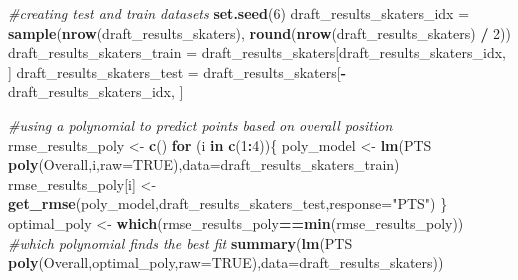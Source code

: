 \documentclass[]{article}
\newenvironment{Shaded}{\begin{snugshade}}{\end{snugshade}}
\newcommand{\CommentTok}[1]{\textcolor[rgb]{0.56,0.35,0.01}{\textit{#1}}}
\newcommand{\ControlFlowTok}[1]{\textcolor[rgb]{0.13,0.29,0.53}{\textbf{#1}}}
\newcommand{\DataTypeTok}[1]{\textcolor[rgb]{0.13,0.29,0.53}{#1}}
\newcommand{\DecValTok}[1]{\textcolor[rgb]{0.00,0.00,0.81}{#1}}
\newcommand{\KeywordTok}[1]{\textcolor[rgb]{0.13,0.29,0.53}{\textbf{#1}}}
\newcommand{\NormalTok}[1]{#1}
\newcommand{\OperatorTok}[1]{\textcolor[rgb]{0.81,0.36,0.00}{\textbf{#1}}}
\newcommand{\OtherTok}[1]{\textcolor[rgb]{0.56,0.35,0.01}{#1}}
\newcommand{\StringTok}[1]{\textcolor[rgb]{0.31,0.60,0.02}{#1}}
\begin{document}
\begin{Shaded}
\begin{Highlighting}[]
\CommentTok{#creating test and train datasets}
\KeywordTok{set.seed}\NormalTok{(}\DecValTok{6}\NormalTok{)}
\NormalTok{draft_results_skaters_idx =}\StringTok{ }\KeywordTok{sample}\NormalTok{(}\KeywordTok{nrow}\NormalTok{(draft_results_skaters), }\KeywordTok{round}\NormalTok{(}\KeywordTok{nrow}\NormalTok{(draft_results_skaters) }\OperatorTok{/}\StringTok{ }\DecValTok{2}\NormalTok{))}
\NormalTok{draft_results_skaters_train =}\StringTok{ }\NormalTok{draft_results_skaters[draft_results_skaters_idx, ]}
\NormalTok{draft_results_skaters_test =}\StringTok{ }\NormalTok{draft_results_skaters[}\OperatorTok{-}\NormalTok{draft_results_skaters_idx, ]}

\CommentTok{#using a polynomial to predict points based on overall position}
\NormalTok{rmse_results_poly <-}\StringTok{ }\KeywordTok{c}\NormalTok{()}
\ControlFlowTok{for}\NormalTok{ (i }\ControlFlowTok{in} \KeywordTok{c}\NormalTok{(}\DecValTok{1}\OperatorTok{:}\DecValTok{4}\NormalTok{))\{}
\NormalTok{  poly_model <-}\StringTok{ }\KeywordTok{lm}\NormalTok{(PTS }\OperatorTok{~}\StringTok{ }\KeywordTok{poly}\NormalTok{(Overall,i,}\DataTypeTok{raw=}\OtherTok{TRUE}\NormalTok{),}\DataTypeTok{data=}\NormalTok{draft_results_skaters_train)}
\NormalTok{  rmse_results_poly[i] <-}\StringTok{ }\KeywordTok{get_rmse}\NormalTok{(poly_model,draft_results_skaters_test,}\DataTypeTok{response=}\StringTok{"PTS"}\NormalTok{)}
\NormalTok{\}}
\NormalTok{optimal_poly <-}\StringTok{ }\KeywordTok{which}\NormalTok{(rmse_results_poly}\OperatorTok{==}\KeywordTok{min}\NormalTok{(rmse_results_poly)) }\CommentTok{#which polynomial finds the best fit}
\KeywordTok{summary}\NormalTok{(}\KeywordTok{lm}\NormalTok{(PTS }\OperatorTok{~}\StringTok{ }\KeywordTok{poly}\NormalTok{(Overall,optimal_poly,}\DataTypeTok{raw=}\OtherTok{TRUE}\NormalTok{),}\DataTypeTok{data=}\NormalTok{draft_results_skaters))}
\end{Highlighting}
\end{Shaded}
\end{document}
